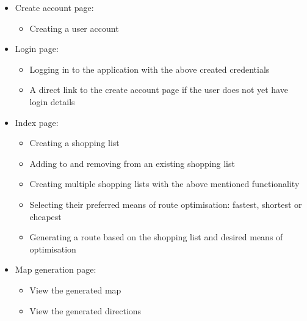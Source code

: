 \documentclass[10pt,twocolumn]{witseiepaper}
\begin{document}
		\begin{itemize}
			\item Create account page:
			\begin{itemize}
				\item Creating a user account
			\end{itemize}
			\item Login page:
			\begin{itemize}
				\item Logging in to the application with the above created credentials
				\item A direct link to the create account page if the user does not yet have login details
			\end{itemize}
			\item Index page:
			\begin{itemize}
				\item Creating a shopping list
				\item Adding to and removing from an existing shopping list
				\item Creating multiple shopping lists with the above mentioned functionality
				\item Selecting their preferred means of route optimisation: fastest, shortest or cheapest
				\item Generating a route based on the shopping list and desired means of optimisation
			\end{itemize}
			\item Map generation page:
			\begin{itemize}
				\item View the generated map
				\item View the generated directions
			\end{itemize}
		\end{itemize}
		
\end{document}
